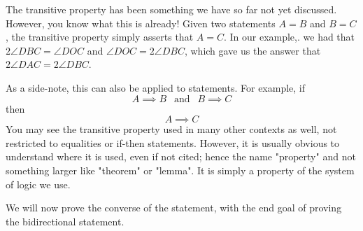 The transitive property has been something we have so far not yet discussed. However, you know what this is already! Given two statements $A = B$ and $B = C$, the transitive property simply asserts that $A = C$. In our example,. we had that $2\angle DBC = \angle DOC$ and $\angle DOC = 2\angle DBC$, which gave us the answer that $2 \angle DAC = 2\angle DBC$.

As a side-note, this can also be applied to statements. For example, if 
\[
A \implies B ~~\text{    and    }~~ B \implies C
\]
then 
\[
A \implies C
\]
You may see the transitive property used in many other contexts as well, not restricted to equalities or if-then statements. However, it is usually obvious to understand where it is used, even if not cited; hence the name "property" and not something larger like "theorem" or "lemma". It is simply a property of the system of logic we use.

We will now prove the converse of the statement, with the end goal of proving the bidirectional statement.

